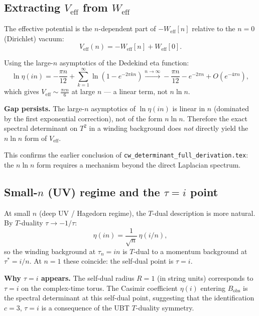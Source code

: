 \documentclass[12pt,a4paper]{article}
\theoremstyle{definition}
\theoremstyle{remark}
\begin{document}
\subsection{Extracting $V_{\mathrm{eff}}$ from $W_{\mathrm{eff}}$}

The effective potential is the $n$-dependent part of $-W_{\mathrm{eff}}[n]$
relative to the $n=0$ (Dirichlet) vacuum:
\begin{equation}
  V_{\mathrm{eff}}(n)
  = -W_{\mathrm{eff}}[n] + W_{\mathrm{eff}}[0].
  \label{eq:cs:Vfromw}
\end{equation}

Using the large-$n$ asymptotics of the Dedekind eta function:
\[
  \ln\eta(in) = -\frac{\pi n}{12} + \sum_{k=1}^\infty \ln(1 - e^{-2\pi kn})
  \xrightarrow{n\to\infty} -\frac{\pi n}{12} - e^{-2\pi n} + O(e^{-4\pi n}),
\]
which gives $V_{\mathrm{eff}} \sim \frac{\pi c n}{6}$ at large $n$ — a linear
term, not $n\ln n$.

\begin{warnbox}
\textbf{Gap persists.}  The large-$n$ asymptotics of $\ln\eta(in)$ is linear
in $n$ (dominated by the first exponential correction), not of the form
$n\ln n$.  Therefore the exact spectral determinant on $T^2$ in a winding
background does \emph{not} directly yield the $n\ln n$ form of $V_{\mathrm{eff}}$.

This confirms the earlier conclusion of \texttt{cw\_determinant\_full\_derivation.tex}:
the $n\ln n$ form requires a mechanism beyond the direct Laplacian spectrum.
\end{warnbox}

\subsection{Small-$n$ (UV) regime and the $\tau = i$ point}

At small $n$ (deep UV / Hagedorn regime), the $T$-dual description is more
natural.  By $T$-duality $\tau \to -1/\tau$:
\begin{equation}
  \eta(in) = \frac{1}{\sqrt{n}}\,\eta(i/n),
  \label{eq:cs:tdual}
\end{equation}
so the winding background at $\tau_n = in$ is $T$-dual to a momentum
background at $\tau^* = i/n$.  At $n = 1$ these coincide: the self-dual
point is $\tau = i$.

\begin{resultbox}
\textbf{Why $\tau = i$ appears.}  The self-dual radius $R = 1$ (in string
units) corresponds to $\tau = i$ on the complex-time torus.  The Casimir
coefficient $\eta(i)$ entering $B_{\mathrm{obs}}$ is the spectral determinant
at this self-dual point, suggesting that the identification $c = 3$,
$\tau = i$ is a consequence of the UBT $T$-duality symmetry.
\end{resultbox}
\end{document}
